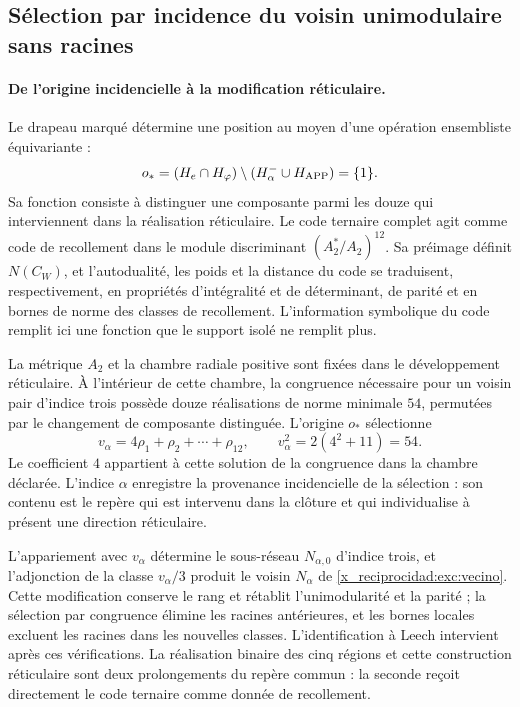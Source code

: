\subsection{Sélection par incidence du voisin unimodulaire sans racines}
\label{x_reciprocidad:exc:leech}


\paragraph{De l'origine incidencielle à la modification réticulaire.}
\label{x_reciprocidad:inc-ampl-reticulo}
Le drapeau marqué détermine une position au moyen d'une opération
ensembliste équivariante :
\[
 o_*=(H_e\cap H_\varphi)
       \setminus(H^-_\alpha\cup H_{\rm APP})=\{1\}.
\]
Sa fonction consiste à distinguer une composante parmi les douze qui
interviennent dans la réalisation réticulaire. Le code ternaire complet
agit comme code de recollement dans le module discriminant
$(A_2^*/A_2)^{12}$. Sa préimage définit $N(C_W)$, et
l'autodualité, les poids et la distance du code se traduisent,
respectivement, en propriétés d'intégralité et de déterminant, de parité
et en bornes de norme des classes de recollement. L'information symbolique
du code remplit ici une fonction que le support isolé ne remplit plus.

La métrique $A_2$ et la chambre radiale positive sont fixées dans le développement
réticulaire. À l'intérieur de cette chambre, la congruence nécessaire pour un voisin
pair d'indice trois possède douze réalisations de norme minimale $54$,
permutées par le changement de composante distinguée. L'origine $o_*$
sélectionne
\[
 v_\alpha=4\rho_1+\rho_2+\cdots+\rho_{12},\qquad
 v_\alpha^2=2(4^2+11)=54.
\]
Le coefficient $4$ appartient à cette solution de la congruence dans la
chambre déclarée. L'indice $\alpha$ enregistre la provenance
incidencielle de la sélection : son contenu est le repère qui est intervenu dans
la clôture et qui individualise à présent une direction réticulaire.

L'appariement avec $v_\alpha$ détermine le sous-réseau
$N_{\alpha,0}$ d'indice trois, et l'adjonction de la classe
$v_\alpha/3$ produit le voisin $N_\alpha$ de
\eqref{x_reciprocidad:exc:vecino}. Cette modification conserve le rang et rétablit
l'unimodularité et la parité ; la sélection par congruence élimine les racines
antérieures, et les bornes locales excluent les racines dans les nouvelles classes.
L'identification à Leech intervient après ces vérifications. La
réalisation binaire des cinq régions et cette construction réticulaire
sont deux prolongements du repère commun : la seconde reçoit directement
le code ternaire comme donnée de recollement.


